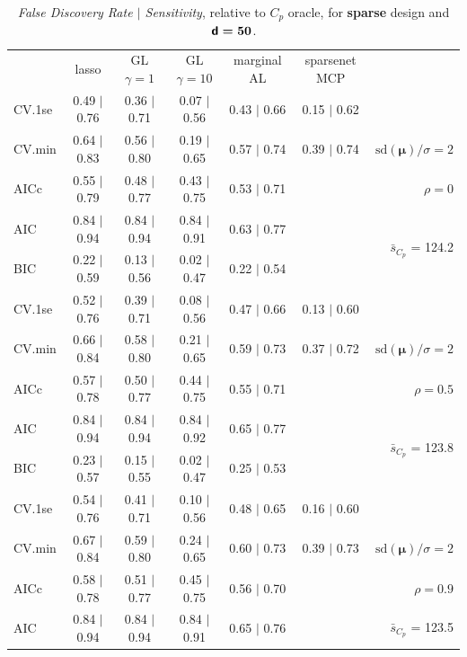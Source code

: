 \documentclass[12pt]{article}
\newcommand{\mr}[1]{\mathrm{#1}}
\newcommand{\bm}[1]{\mathbf{#1}}
\begin{document}
\begin{table}[p]\vspace{-.5cm}
\caption[l]{ {\it False Discovery Rate $\mid$ Sensitivity}, 
relative to $C_p$ oracle, for {\bf sparse} design and $\boldsymbol{{\sf d}=50}$.}
\vspace{-.5cm}
\small{}
\begin{center}
\begin{tabular}{l*{5}{c}|r}
 & lasso & GL $\gamma=1$ & GL $\gamma=10$ & marginal AL & sparsenet MCP  & \\
 \cline{1-7}
CV.1se & 0.49 $\mid$ 0.76 & 0.36 $\mid$ 0.71 & 0.07 $\mid$ 0.56 & 0.43 $\mid$ 0.66 & 0.15 $\mid$ 0.62 &\\
CV.min & 0.64 $\mid$ 0.83 & 0.56 $\mid$ 0.80 & 0.19 $\mid$ 0.65 & 0.57 $\mid$ 0.74 & 0.39 $\mid$ 0.74 &  $\mr{sd}(\bm{\mu})/\sigma=2$ \\
AICc & 0.55 $\mid$ 0.79 & 0.48 $\mid$ 0.77 & 0.43 $\mid$ 0.75 & 0.53 $\mid$ 0.71 & & $\rho=0$ \\
AIC & 0.84 $\mid$ 0.94 & 0.84 $\mid$ 0.94 & 0.84 $\mid$ 0.91 & 0.63 $\mid$ 0.77 & & \multirow{2}{*}{$\bar{s}_{C_p}$ = 124.2} \\
BIC & 0.22 $\mid$ 0.59 & 0.13 $\mid$ 0.56 & 0.02 $\mid$ 0.47 & 0.22 $\mid$ 0.54 & & \\
 \hline 
CV.1se & 0.52 $\mid$ 0.76 & 0.39 $\mid$ 0.71 & 0.08 $\mid$ 0.56 & 0.47 $\mid$ 0.66 & 0.13 $\mid$ 0.60 &\\
CV.min & 0.66 $\mid$ 0.84 & 0.58 $\mid$ 0.80 & 0.21 $\mid$ 0.65 & 0.59 $\mid$ 0.73 & 0.37 $\mid$ 0.72 &  $\mr{sd}(\bm{\mu})/\sigma=2$ \\
AICc & 0.57 $\mid$ 0.78 & 0.50 $\mid$ 0.77 & 0.44 $\mid$ 0.75 & 0.55 $\mid$ 0.71 & & $\rho=0.5$ \\
AIC & 0.84 $\mid$ 0.94 & 0.84 $\mid$ 0.94 & 0.84 $\mid$ 0.92 & 0.65 $\mid$ 0.77 & & \multirow{2}{*}{$\bar{s}_{C_p}$ = 123.8} \\
BIC & 0.23 $\mid$ 0.57 & 0.15 $\mid$ 0.55 & 0.02 $\mid$ 0.47 & 0.25 $\mid$ 0.53 & & \\
 \hline 
CV.1se & 0.54 $\mid$ 0.76 & 0.41 $\mid$ 0.71 & 0.10 $\mid$ 0.56 & 0.48 $\mid$ 0.65 & 0.16 $\mid$ 0.60 &\\
CV.min & 0.67 $\mid$ 0.84 & 0.59 $\mid$ 0.80 & 0.24 $\mid$ 0.65 & 0.60 $\mid$ 0.73 & 0.39 $\mid$ 0.73 &  $\mr{sd}(\bm{\mu})/\sigma=2$ \\
AICc & 0.58 $\mid$ 0.78 & 0.51 $\mid$ 0.77 & 0.45 $\mid$ 0.75 & 0.56 $\mid$ 0.70 & & $\rho=0.9$ \\
AIC & 0.84 $\mid$ 0.94 & 0.84 $\mid$ 0.94 & 0.84 $\mid$ 0.91 & 0.65 $\mid$ 0.76 & & \multirow{2}{*}{$\bar{s}_{C_p}$ = 123.5} \\

\end{tabular}
\end{center}
\end{table}
\end{document}
